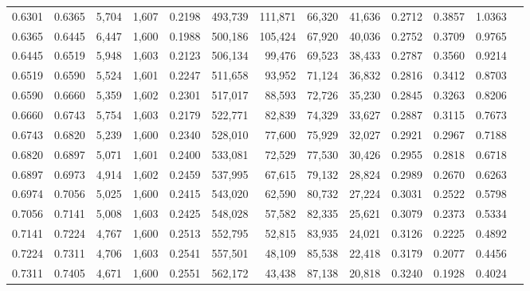 \begin{tabular}{rrrrrrrrrrrrr}
0.6301 & 0.6365 &  5,704 & 1,607 &                                     0.2198 & 493,739 & 111,871 &  66,320 &  41,636 & 0.2712 & 0.3857 & 1.0363 \\
0.6365 & 0.6445 &  6,447 & 1,600 &                                     0.1988 & 500,186 & 105,424 &  67,920 &  40,036 & 0.2752 & 0.3709 & 0.9765 \\
0.6445 & 0.6519 &  5,948 & 1,603 &                                     0.2123 & 506,134 &  99,476 &  69,523 &  38,433 & 0.2787 & 0.3560 & 0.9214 \\
0.6519 & 0.6590 &  5,524 & 1,601 &                                     0.2247 & 511,658 &  93,952 &  71,124 &  36,832 & 0.2816 & 0.3412 & 0.8703 \\
0.6590 & 0.6660 &  5,359 & 1,602 &                                     0.2301 & 517,017 &  88,593 &  72,726 &  35,230 & 0.2845 & 0.3263 & 0.8206 \\
0.6660 & 0.6743 &  5,754 & 1,603 &                                     0.2179 & 522,771 &  82,839 &  74,329 &  33,627 & 0.2887 & 0.3115 & 0.7673 \\
0.6743 & 0.6820 &  5,239 & 1,600 &                                     0.2340 & 528,010 &  77,600 &  75,929 &  32,027 & 0.2921 & 0.2967 & 0.7188 \\
0.6820 & 0.6897 &  5,071 & 1,601 &                                     0.2400 & 533,081 &  72,529 &  77,530 &  30,426 & 0.2955 & 0.2818 & 0.6718 \\
0.6897 & 0.6973 &  4,914 & 1,602 &                                     0.2459 & 537,995 &  67,615 &  79,132 &  28,824 & 0.2989 & 0.2670 & 0.6263 \\
0.6974 & 0.7056 &  5,025 & 1,600 &                                     0.2415 & 543,020 &  62,590 &  80,732 &  27,224 & 0.3031 & 0.2522 & 0.5798 \\
0.7056 & 0.7141 &  5,008 & 1,603 &                                     0.2425 & 548,028 &  57,582 &  82,335 &  25,621 & 0.3079 & 0.2373 & 0.5334 \\
0.7141 & 0.7224 &  4,767 & 1,600 &                                     0.2513 & 552,795 &  52,815 &  83,935 &  24,021 & 0.3126 & 0.2225 & 0.4892 \\
0.7224 & 0.7311 &  4,706 & 1,603 &                                     0.2541 & 557,501 &  48,109 &  85,538 &  22,418 & 0.3179 & 0.2077 & 0.4456 \\
0.7311 & 0.7405 &  4,671 & 1,600 &                                     0.2551 & 562,172 &  43,438 &  87,138 &  20,818 & 0.3240 & 0.1928 & 0.4024 \\

\end{tabular}
